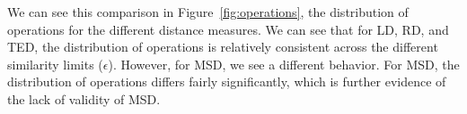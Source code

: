 We can see this comparison in Figure~\ref{fig:operations}, the distribution of operations for the different distance measures. We can see that for LD, RD, and TED, the distribution of operations is relatively consistent across the different similarity limits ($\epsilon$). However, for MSD, we see a different behavior. For MSD, the distribution of operations differs fairly significantly, which is further evidence of the lack of validity of MSD.

\begin{figure}
\centering
{}
\end{figure}

